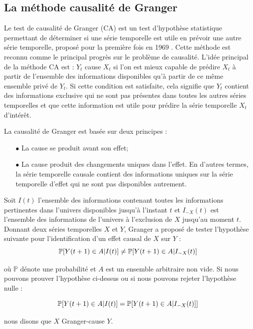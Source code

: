 \subsection{La méthode causalité de Granger}
Le test de causalité de Granger (CA) est un test d'hypothèse statistique permettant de déterminer si une série temporelle est utile en prévoir une autre série temporelle, proposé pour la première fois en 1969 \cite{granger1969}. Cette méthode est reconnu comme le principal progrès sur le problème de causalité. L'idée principal de la méthode CA est : $Y_t$ cause $X_t$ si l’on est mieux capable de prédire $X_t$ à partir de l’ensemble des informations disponibles qu’à partir de ce même ensemble privé de $Y_t$\cite{granger1969,granger1980}. Si cette condition est satisfaite, cela signifie que $Y_t$ contient des informations exclusive qui ne sont pas présentes dans toutes les autres séries temporelles et que cette information est utile pour prédire la série temporelle $X_t$ d'intérêt. 

La causalité de Granger est basée sur deux principes : 
\begin{itemize} 
\item[$\bullet$] La cause se produit avant son effet;
\item[$\bullet$] La cause produit des changements uniques dans l'effet. En d'autres termes, la série temporelle causale contient des informations uniques sur la série temporelle d'effet qui ne sont pas disponibles autrement.
\end{itemize} 
Soit $I(t)$ l'ensemble des informations contenant toutes les informations pertinentes dans l'univers disponibles jusqu'à l'instant $t$ et $I_{-X}(t)$ est l'ensemble des informations de l'univers à l'exclusion de $X$ jusqu'au moment $t$. Donnant deux séries temporelles $X$ et $Y$, Granger a proposé de tester l'hypothèse suivante pour l'identification d'un effet causal de $X$ sur $Y$ :
 $$ \mathbb{P}[Y(t + 1) \in A \arrowvert I(t)] \neq \mathbb{P}[Y(t + 1) \in A \arrowvert I_{-X}(t)] $$
 
où $\mathbb{P}$ dénote une probabilité et $A$ est un ensemble arbitraire non vide. Si nous pouvons prouver l'hypothèse ci-dessus ou si nous pouvons rejeter l'hypothèse nulle :

 $$  \mathbb{P} [Y(t + 1) \in A \arrowvert I(t)] = \mathbb {P} [Y (t + 1) \in A \arrowvert I_{-X} (t)] ]$$  
 
 nous disons que $X$ Granger-cause $Y$.
 
